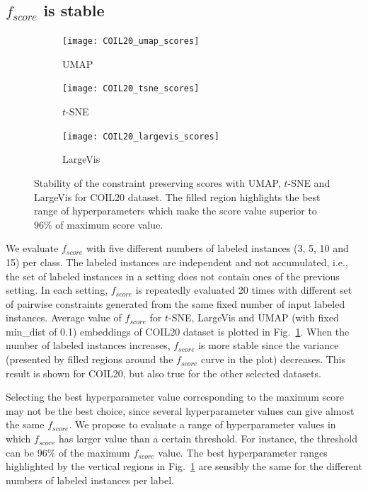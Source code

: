 \subsection{$f_{score}$ is stable}\label{sec:stability}

\begin{figure}[ht!]
    \begin{subfigure}[b]{0.32\linewidth}
         \centering
         \texttt{[image: COIL20\_umap\_scores]}
         \caption{UMAP}
    \end{subfigure}
    \hfill
    \begin{subfigure}[b]{0.32\linewidth}
         \centering
         \texttt{[image: COIL20\_tsne\_scores]}
         \caption{$t$-SNE}
    \end{subfigure}
    \hfill
    \begin{subfigure}[b]{0.32\linewidth}
         \centering
         \texttt{[image: COIL20\_largevis\_scores]}
         \caption{LargeVis}
    \end{subfigure}
    \caption{Stability of the constraint preserving scores with UMAP, $t$-SNE and LargeVis for COIL20 dataset.
    The filled region highlights the best range of hyperparameters which make the score value superior to 96\% of maximum score value.}
    \label{fig:score:stability:COIL20}
\end{figure}

We evaluate $f_{score}$ with five different numbers of labeled instances (3, 5, 10 and 15) per class.
The labeled instances are independent and not accumulated, i.e., the set of labeled instances in a setting does not contain ones of the previous setting.
In each setting, $f_{score}$ is repeatedly evaluated 20 times with different set of pairwise constraints generated from the same fixed number of input labeled instances.
Average value of $f_{score}$ for $t$-SNE, LargeVis and UMAP (with fixed {min\_dist} of 0.1) embeddings of COIL20 dataset is plotted in Fig.~\ref{fig:score:stability:COIL20}.
When the number of labeled instances increases, $f_{score}$ is more stable since the variance (presented by filled regions around the $f_{score}$ curve in the plot) decreases.
This result is shown for COIL20, but also true for the other selected datasets.

Selecting the best hyperparameter value corresponding to the maximum score may not be the best choice, since several hyperparameter values can give almost the same $f_{score}$.
We propose to evaluate a range of hyperparameter values in which $f_{score}$ has larger value than a certain threshold. %
For instance, the threshold can be 96\% of the maximum $f_{score}$ value.
The best hyperparameter ranges highlighted by the vertical regions in Fig.~\ref{fig:score:stability:COIL20} are sensibly the same for the different numbers of labeled instances per label.

